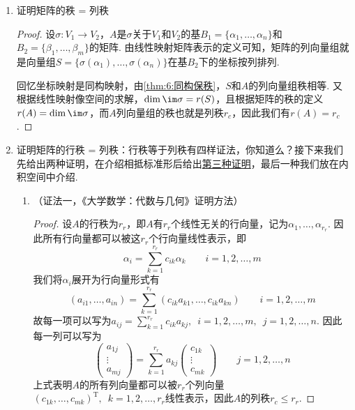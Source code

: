 \begin{enumerate}
    \item 证明矩阵的秩 = 列秩

          \begin{proof}
              设$\sigma:V_1\to V_2$，$A$是$\sigma$关于$V_1$和$V_2$的基$B_1=\{\alpha_1,\ldots,\alpha_n\}$和$B_2=\{\beta_1,\ldots,\beta_m\}$的矩阵. 由线性映射矩阵表示的定义可知，矩阵的列向量组就是向量组$S=\{\sigma(\alpha_1),\ldots,\sigma(\alpha_n)\}$在基$B_2$下的坐标按列排列.

              回忆坐标映射是同构映射，由\autoref{thm:6:同构保秩}，$S$和$A$的列向量组秩相等. 又根据线性映射像空间的求解，$\dim\im\sigma=r(S)$，且根据矩阵的秩的定义$r(A)=\dim\im\sigma$，而$A$列向量组的秩也就是列秩$r_c$，因此我们有$r(A)=r_c$.
          \end{proof}

    \item 证明矩阵的行秩 = 列秩：行秩等于列秩有四样证法，你知道么？接下来我们先给出两种证明，在介绍相抵标准形后给出\hyperref[pf:11:矩阵行秩=列秩]{第三种证明}，最后一种我们放在内积空间中介绍.
          \begin{enumerate}
              \item （证法一，《大学数学：代数与几何》证明方法）

                    \begin{proof}
                        设$A$的行秩为$r_r$，即$A$有$r_r$个线性无关的行向量，记为$\alpha_1,\ldots,\alpha_{r_r}$. 因此所有行向量都可以被这$r_r$个行向量线性表示，即
                        \[\alpha_i=\sum_{k=1}^{r_r}c_{ik}\alpha_k\qquad i=1,2,\ldots,m\]
                        我们将$\alpha_i$展开为行向量形式有
                        \[(a_{i1},\ldots,a_{in})=\sum_{k=1}^{r_r}(c_{ik}a_{k1},\ldots,c_{ik}a_{kn})\qquad i=1,2,\ldots,m\]
                        故每一项可以写为$a_{ij}=\displaystyle\sum_{k=1}^{r_r}c_{ik}a_{kj},\enspace i=1,2,\ldots,m,\enspace j=1,2,\ldots,n$. 因此每一列可以写为
                        \[\begin{pmatrix}
                                a_{1j} \\ \vdots \\ a_{mj}
                            \end{pmatrix}=\sum_{k=1}^{r_r}a_{kj}\begin{pmatrix}
                                c_{1k} \\ \vdots \\ c_{mk}
                            \end{pmatrix}\qquad j=1,2,\ldots,n\]
                        上式表明$A$的所有列向量都可以被$r_r$个列向量$(c_{1k},\ldots,c_{mk})^\mathrm{T},\enspace k=1,2,\ldots,r_r$线性表示，因此$A$的列秩$r_c\leqslant r_r$.


\end{proof}
\end{enumerate}
\end{enumerate}
